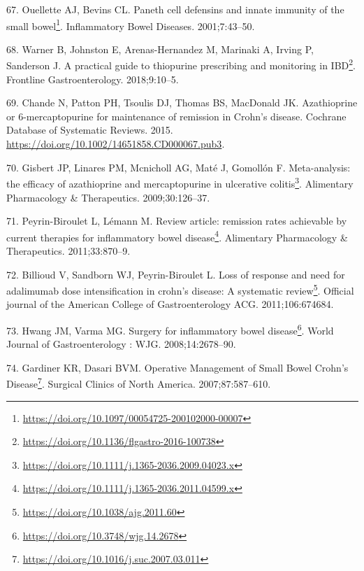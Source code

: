 \documentclass[
  a4paper,
]{book}
\DeclareRobustCommand{\href}[2]{#2\footnote{\url{#1}}}
\newlength{\cslhangindent}
\newlength{\cslentryspacingunit} %
\newenvironment{CSLReferences}[2] %
 {%
  \setlength{\parindent}{0pt}
  \ifodd #1
  \let\oldpar\par
  \def\par{\hangindent=\cslhangindent\oldpar}
  \fi
  \setlength{\parskip}{#2\cslentryspacingunit}
 }%
 {}
\begin{document}
\begin{CSLReferences}{0}{0}
\leavevmode{}%
67. Ouellette AJ, Bevins CL. \href{https://doi.org/10.1097/00054725-200102000-00007}{Paneth cell defensins and innate immunity of the small bowel}. Inflammatory Bowel Diseases. 2001;7:43--50.

\leavevmode{}%
68. Warner B, Johnston E, Arenas-Hernandez M, Marinaki A, Irving P, Sanderson J. \href{https://doi.org/10.1136/flgastro-2016-100738}{A practical guide to thiopurine prescribing and monitoring in IBD}. Frontline Gastroenterology. 2018;9:10--5.

\leavevmode{}%
69. Chande N, Patton PH, Tsoulis DJ, Thomas BS, MacDonald JK. Azathioprine or 6{-}mercaptopurine for maintenance of remission in Crohn's disease. Cochrane Database of Systematic Reviews. 2015. \url{https://doi.org/10.1002/14651858.CD000067.pub3}.

\leavevmode{}%
70. Gisbert JP, Linares PM, Mcnicholl AG, Maté J, Gomollón F. \href{https://doi.org/10.1111/j.1365-2036.2009.04023.x}{Meta-analysis: the efficacy of azathioprine and mercaptopurine in ulcerative colitis}. Alimentary Pharmacology \& Therapeutics. 2009;30:126--37.

\leavevmode{}%
71. Peyrin-Biroulet L, Lémann M. \href{https://doi.org/10.1111/j.1365-2036.2011.04599.x}{Review article: remission rates achievable by current therapies for inflammatory bowel disease}. Alimentary Pharmacology \& Therapeutics. 2011;33:870--9.

\leavevmode{}%
72. Billioud V, Sandborn WJ, Peyrin-Biroulet L. \href{https://doi.org/10.1038/ajg.2011.60}{Loss of response and need for adalimumab dose intensification in crohn's disease: A systematic review}. Official journal of the American College of Gastroenterology \textbar{} ACG. 2011;106:674684.

\leavevmode{}%
73. Hwang JM, Varma MG. \href{https://doi.org/10.3748/wjg.14.2678}{Surgery for inflammatory bowel disease}. World Journal of Gastroenterology : WJG. 2008;14:2678--90.

\leavevmode{}%
74. Gardiner KR, Dasari BVM. \href{https://doi.org/10.1016/j.suc.2007.03.011}{Operative Management of Small Bowel Crohn's Disease}. Surgical Clinics of North America. 2007;87:587--610.


\end{CSLReferences}
\end{document}
